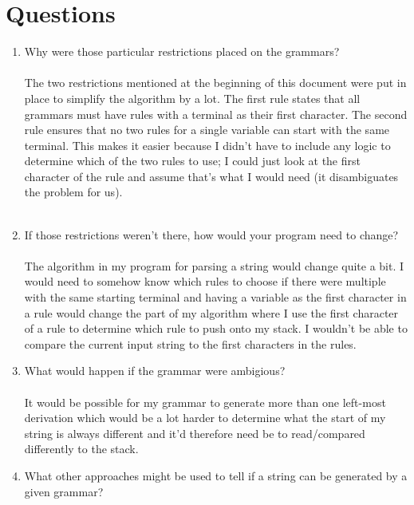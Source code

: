 \documentclass[11pt]{article}
\begin{document}
\section*{Questions}
    \begin{enumerate}
        \item Why were those particular restrictions placed on the grammars?
        \paragraph{} The two restrictions mentioned at the beginning of this document were put in place to simplify the algorithm by a lot. The first rule states that all grammars must have rules with a terminal as their first character. The second rule ensures that no two rules for a single variable can start with the same terminal. This makes it easier because I didn't have to include any logic to determine which of the two rules to use; I could just look at the first character of the rule and assume that's what I would need (it disambiguates the problem for us).
\\ \\   \item If those restrictions weren't there, how would your program need to change?
        \paragraph{} The algorithm in my program for parsing a string would change quite a bit. I would need to somehow know which rules to choose if there were multiple with the same starting terminal and having a variable as the first character in a rule would change the part of my algorithm where I use the first character of a rule to determine which rule to push onto my stack. I wouldn't be able to compare the current input string to the first characters in the rules.
        
        \item What would happen if the grammar were ambigious?
        \paragraph{} It would be possible for my grammar to generate more than one left-most derivation which would be a lot harder to determine what the start of my string is always different and it'd therefore need be to read/compared differently to the stack.
        \item What other approaches might be used to tell if a string can be generated by a given grammar?

\end{enumerate}
\end{document}
